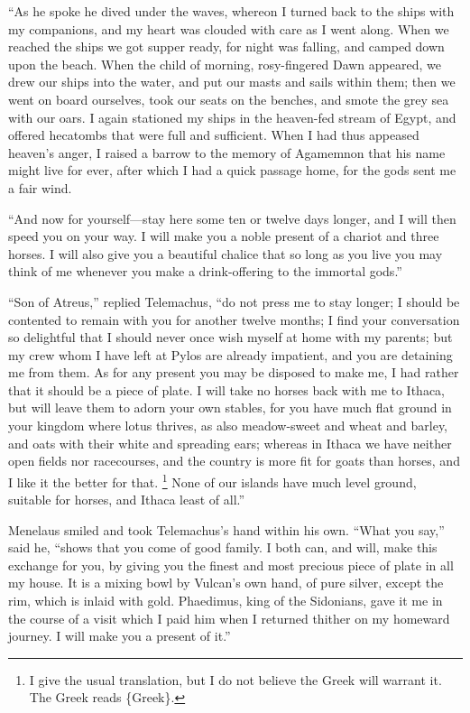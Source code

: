“As he spoke he dived under the waves, whereon I turned back to the ships with
my companions, and my heart was clouded with care as I went along. When we
reached the ships we got supper ready, for night was falling, and camped down
upon the beach. When the child of morning, rosy-fingered Dawn appeared, we drew
our ships into the water, and put our masts and sails within them; then we went
on board ourselves, took our seats on the benches, and smote the grey sea with
our oars. I again stationed my ships in the heaven-fed stream of Egypt, and
offered hecatombs that were full and sufficient. When I had thus appeased
heaven’s anger, I raised a barrow to the memory of Agamemnon that his name
might live for ever, after which I had a quick passage home, for the gods sent
me a fair wind.

“And now for yourself—stay here some ten or twelve days longer, and I will then
speed you on your way. I will make you a noble present of a chariot and three
horses. I will also give you a beautiful chalice that so long as you live you
may think of me whenever you make a drink-offering to the immortal gods.”

“Son of Atreus,” replied Telemachus, “do not press me to stay longer; I should
be contented to remain with you for another twelve months; I find your
conversation so delightful that I should never once wish myself at home with my
parents; but my crew whom I have left at Pylos are already impatient, and you
are detaining me from them. As for any present you may be disposed to make me,
I had rather that it should be a piece of plate. I will take no horses back
with me to Ithaca, but will leave them to adorn your own stables, for you have
much flat ground in your kingdom where lotus thrives, as also meadow-sweet and
wheat and barley, and oats with their white and spreading ears; whereas in
Ithaca we have neither open fields nor racecourses, and the country is more fit
for goats than horses, and I like it the better for that. \footnote{I give the usual translation, but I do not believe the Greek will warrant
it. The Greek reads \{Greek\}.} None of our
islands have much level ground, suitable for horses, and Ithaca least of all.”

Menelaus smiled and took Telemachus’s hand within his own. “What you say,” said
he, “shows that you come of good family. I both can, and will, make this
exchange for you, by giving you the finest and most precious piece of plate in
all my house. It is a mixing bowl by Vulcan’s own hand, of pure silver, except
the rim, which is inlaid with gold. Phaedimus, king of the Sidonians, gave it
me in the course of a visit which I paid him when I returned thither on my
homeward journey. I will make you a present of it.”

